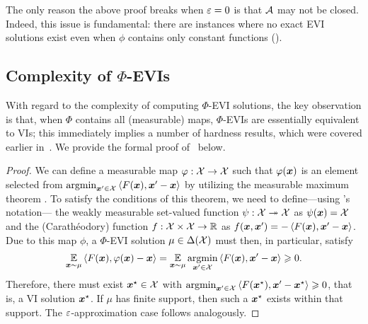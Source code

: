 The only reason the above proof breaks when $\varepsilon = 0$ is that ${\mathcal{A}}$ may not be closed. Indeed, this issue is fundamental: there are instances where no exact EVI solutions exist even when $\phi$ contains only constant functions ().

\subsection{Complexity of $\Phi$-EVIs}

With regard to the complexity of computing $\Phi$-EVI solutions, the key observation is that, when $\Phi$ contains all (measurable) maps, $\Phi$-EVIs are essentially equivalent to VIs; this immediately implies a number of hardness results, which were covered earlier in~. We provide the formal proof of~ below.

\EVIequiv*

\begin{proof}
    We can define a measurable map $\varphi : {\mathcal{X}} \to {\mathcal{X}}$ such that $\varphi({\bm{x}})$ is an element selected from $\argmin_{\vx' \in \cX} \ip{F(\vx), \vx' - \vx}$ by utilizing the measurable maximum theorem \citep[Theorem 18.19]{AliprantisB06:Infinite}. To satisfy the conditions of this theorem, we need to define---using \citeauthor{AliprantisB06:Infinite}'s notation--- the weakly measurable set-valued function $\psi : {\mathcal{X}} \twoheadrightarrow {\mathcal{X}}$ as $\psi({\bm{x}}) = {\mathcal{X}}$ and the (Carath\'eodory) function $f : {\mathcal{X}} \times {\mathcal{X}} \to \mathbb R$ as $f(\vx,\vx') = - \ip{F(\vx), \vx' - \vx}$. Due to this map $\phi$, a $\Phi$-EVI solution $\mu \in \Delta({\mathcal{X}})$ must then, in particular, satisfy
    \begin{align*}
        \E_{\vx\sim\mu} \ip{F(\vx), \phi(\vx) - \vx} = \E_{\vx\sim\mu} \argmin_{\vx' \in \cX} \ip{F(\vx), \vx' - \vx} \ge 0.
    \end{align*}
    Therefore, there must exist ${\bm{x}}^\star \in {\mathcal{X}}$ with $\argmin_{\vx' \in \cX} \ip{F(\vxstar), \vx' - \vxstar} \ge 0$, that is, a VI solution ${\bm{x}}^\star$. If $\mu$ has finite support, then such a ${\bm{x}}^\star$ exists within that support. The $\varepsilon$-approximation case follows analogously.
\end{proof}


\iffalse
One may have hoped that expected fixed points would save us from the above hardness result. Clearly that cannot be the case, since we have already established that the EVI problem is hard in general. But what goes wrong? The answer is the following. We need a separation oracle, that is, given $\phi \in \Phi$ we need to find $\mu$ such that $\ip{F(\vx), \phi(\vx) - \vx}$. \et{(The mathematical statement needs to be completed here.)} An expected fixed point, that is, a solution to $\E_{\vx\sim\mu}[\phi(\vx) - \vx] = 0$, does not satisfy this, because in general it is not the case that
    \begin{align}
        \E_{\vx\sim\mu}\ip{F(\vx), \phi(\vx) - \vx} = \big\langle\E_{\vx\sim\mu}F(\vx), \E_{\vx\sim\mu}[\phi(\vx) - \vx]\big\rangle
    \end{align}
because $F(\vx)$ and $\phi(\vx) - \vx$ may not be independent.
\fi


